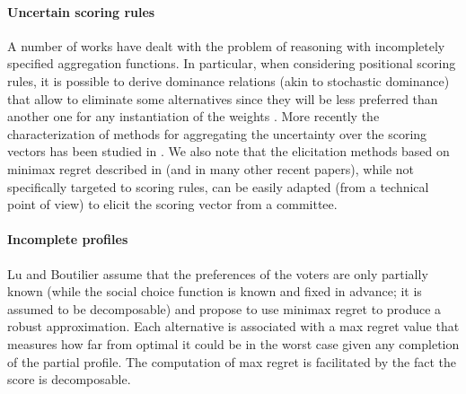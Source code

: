 \documentclass[12pt]{article}
\newcommand{\ppref}{\succ^\text{p}}%
\DeclareMathOperator{\PMR}{PMR}
\DeclareMathOperator{\MR}{MR}
\DeclareMathOperator{\MMR}{MMR}
\begin{document}
\paragraph{Uncertain scoring rules}
A number of works have dealt with the problem of reasoning with incompletely specified aggregation functions.
In particular, when considering positional scoring rules, it is possible to derive dominance relations (akin to stochastic dominance) that allow to eliminate some alternatives since they will be less preferred than another one for any instantiation of the weights \cite{Stein1994}.
More recently the characterization of methods for aggregating the uncertainty over the scoring vectors has been studied in \cite{Viappiani2018}.
We also note that the elicitation methods based on minimax regret described in \cite{Boutilier2006} (and in many other recent papers), while not specifically targeted to scoring rules, can be easily adapted (from a technical point of view) to elicit the scoring vector from a committee.

\paragraph{Incomplete profiles}

Lu and Boutilier \cite{Lu2011} assume that the preferences of the voters are only partially known (while the social choice function is known and fixed in advance; it is assumed to be decomposable) and 
 propose to use minimax regret to produce a robust approximation.
Each alternative is associated with a max regret value that measures how far from optimal it could be in the worst case given any completion of the partial profile.
The computation of max regret is facilitated by the fact the score is decomposable.


% 
\end{document}
